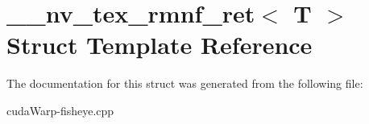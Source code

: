 \hypertarget{struct____nv__tex__rmnf__ret}{}\section{\+\_\+\+\_\+nv\+\_\+tex\+\_\+rmnf\+\_\+ret$<$ T $>$ Struct Template Reference}
\label{struct____nv__tex__rmnf__ret}


The documentation for this struct was generated from the following file\+:\begin{DoxyCompactItemize}
\item 
cuda\+Warp-\/fisheye.\+cpp\end{DoxyCompactItemize}
